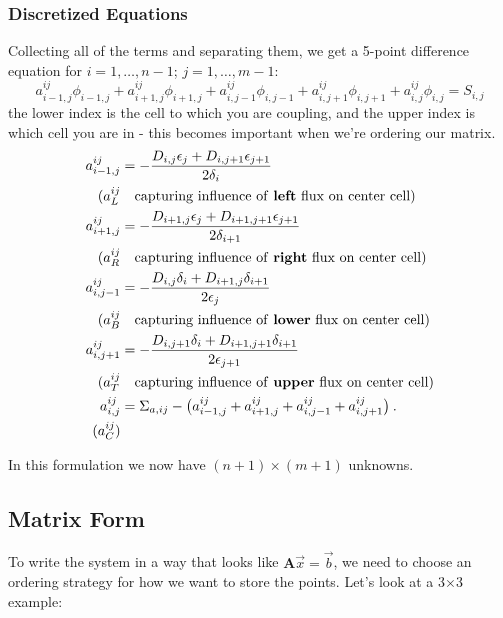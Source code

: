 \documentclass[12pt]{article}
\newcommand{\ve}[1]{\ensuremath{\mathbf{#1}}}
\begin{document}
\subsubsection{Discretized Equations}
Collecting all of the terms and separating them, we get a 5-point difference equation for $i=1,\dots,n-1$; $j=1,\dots,m-1$:
%
\[a_{i-1,j}^{ij}\phi_{i-1,j} + a_{i+1,j}^{ij}\phi_{i+1,j} + a_{i,j-1}^{ij}\phi_{i,j-1} + a_{i,j+1}^{ij}\phi_{i,j+1} +  a_{i,j}^{ij}\phi_{i,j} = S_{i,j} \]
%
the lower index is the cell to which you are coupling, and the upper index is which cell you are in - this becomes important when we're ordering our matrix.
%
\begin{align}
a_{i-1,j}^{ij} &= -\frac{D_{i,j} \epsilon_{j} + D_{i,j+1} \epsilon_{j+1}}{2 \delta_{i}}  \nonumber \\
(a_L^{ij} & \quad \text{capturing influence of \textbf{left} flux on center cell}) \nonumber \\
%
a_{i+1,j}^{ij} &= -\frac{D_{i+1,j} \epsilon_{j} + D_{i+1,j+1} \epsilon_{j+1}}{2 \delta_{i+1}}  \nonumber \\
(a_R^{ij} & \quad \text{capturing influence of \textbf{right} flux on center cell}) \nonumber \\
%
a_{i,j-1}^{ij} &= -\frac{D_{i,j} \delta_{i} + D_{i+1,j} \delta_{i+1}}{2 \epsilon_{j}}  \nonumber \\
(a_B^{ij} & \quad \text{capturing influence of \textbf{lower} flux on center cell}) \nonumber \\
%
a_{i,j+1}^{ij} &= -\frac{D_{i,j+1} \delta_{i} + D_{i+1,j+1} \delta_{i+1}}{2 \epsilon_{j+1}}  \nonumber \\
(a_T^{ij} & \quad \text{capturing influence of \textbf{upper} flux on center cell}) \nonumber \\
%
a_{i,j}^{ij} &= \Sigma_{a,ij} - \bigl(a_{i-1,j}^{ij} + a_{i+1,j}^{ij} + a_{i,j-1}^{ij} + a_{i,j+1}^{ij} \bigr)
 \:.\nonumber \\
 (a_C^{ij}) & \nonumber
\end{align}

In this formulation we now have $(n+1) \times (m+1)$ unknowns. 

\subsection{Matrix Form}
To write the system in a way that looks like $\ve{A}\vec{x} = \vec{b}$, we need to choose an ordering strategy for how we want to store the points. Let's look at a 3$\times$3 example:
\end{document}
